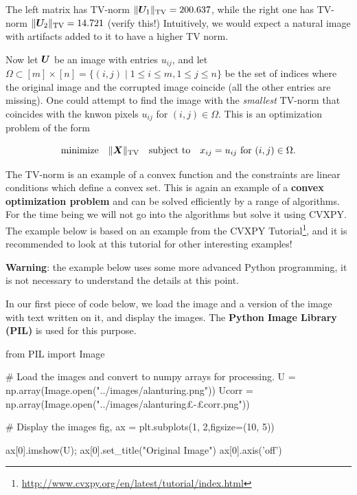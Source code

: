 \begin{example}
The left matrix has TV-norm $\|\bm{U}_1\|_{\mathrm{TV}} = 200.637$, while the right one has TV-norm $\|\bm{U}_2\|_{\mathrm{TV}} = 14.721$ (verify this!) Intuitively, we would expect a natural image with artifacts added to it to have a higher TV norm.

Now let $\bm{U}$ be an image with entries $u_{ij}$, and let $\Omega\subset [m]\times [n] = \{(i,j) \mid 1\leq i\leq m, 1\leq j\leq n\}$ be the set of indices where the original image and the corrupted image coincide (all the other entries are missing). One could attempt to find the image with the {\em smallest} TV-norm that coincides with the knwon pixels $u_{ij}$ for $(i,j)\in \Omega$. This is an optimization problem of the form

\begin{equation*}
  \text{minimize}\quad \|\bm{X}\|_{\mathrm{TV}} \quad\text{subject to}\quad x_{ij} = u_{ij} \text{ for } (i,j) \in \Omega.
\end{equation*}

The TV-norm is an example of a convex function and the constraints are linear conditions which define a convex set. This is again an example of a \textbf{convex optimization problem} and can be solved efficiently by a range of algorithms. For the time being we will not go into the algorithms but solve it using CVXPY. The example below is based on an example from the CVXPY Tutorial\footnote{\url{http://www.cvxpy.org/en/latest/tutorial/index.html}}, and it is recommended to look at this tutorial for other interesting examples! 

\textbf{Warning}: the example below uses some more advanced Python programming, it is not necessary to understand the details at this point. 

In our first piece of code below, we load the image and a version of the image with text written on it, and display the images. The \textbf{Python Image Library (PIL)} is used for this purpose.

\begin{ipythonnb}[9]
from PIL import Image

# Load the images and convert to numpy arrays for processing.
U = np.array(Image.open("../images/alanturing.png"))
Ucorr = np.array(Image.open("../images/alanturing£\color{darkred}-£corr.png"))

# Display the images
fig, ax = plt.subplots(1, 2,figsize=(10, 5))

ax[0].imshow(U);
ax[0].set_title("Original Image")
ax[0].axis('off')


\end{ipythonnb}
\end{example}
